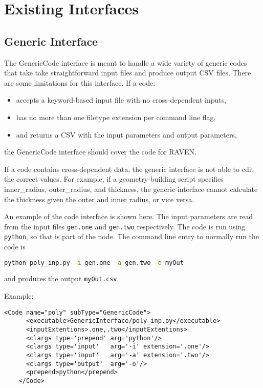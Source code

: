 \section{Existing Interfaces}
\label{sec:existingInterface}
\subsection{Generic Interface}
\label{subsec:genericInterface}
The GenericCode interface is meant to handle a wide variety of generic codes
that take take straightforward input files and produce output CSV files.  There are
some limitations for this interface.
If a code: \vspace{-20pt}
\begin{itemize}
\item accepts a keyword-based input file with no cross-dependent inputs,
\item has no more than one filetype extension per command line flag,
\item and returns a CSV with the input parameters and output parameters,
\end{itemize}\vspace{-20pt}
the GenericCode interface should cover the code for RAVEN.

If a code contains cross-dependent data, the generic interface is not able to
edit the correct values.  For example, if a geometry-building script specifies
inner\_radius, outer\_radius, and thickness, the generic interface cannot
calculate the thickness given the outer and inner radius, or vice versa.

 An example of the code interface is shown here.  The input parameters are read
 from the input files \texttt{gen.one} and \texttt{gen.two} respectively.
 The code is run using \texttt{python}, so that is part of the  node.
 The command line entry to normally run the code is
\begin{lstlisting}[language=bash]
python poly_inp.py -i gen.one -a gen.two -o myOut
\end{lstlisting}
and produces the output \texttt{myOut.csv}.

Example:
\begin{lstlisting}[style=XML]
    <Code name="poly" subType="GenericCode">
      <executable>GenericInterface/poly_inp.py</executable>
      <inputExtentions>.one,.two</inputExtentions>
      <clargs type='prepend' arg='python'/>
      <clargs type='input'   arg='-i' extension='.one'/>
      <clargs type='input'   arg='-a' extension='.two'/>
      <clargs type='output'  arg='-o'/>
      <prepend>python</prepend>
    </Code>
\end{lstlisting}

